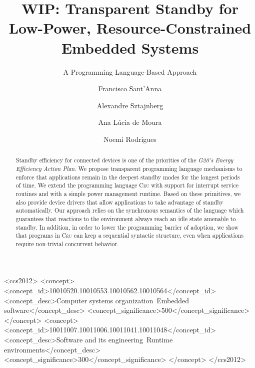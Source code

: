 \documentclass[sigplan,screen]{acmart}
\newcommand{\CEU}{\textsc{C\'{e}u}\xspace}
\begin{document}
\title{WIP: Transparent Standby for Low-Power, Resource-Constrained Embedded Systems}
\subtitle{A Programming Language-Based Approach}


\author[F.~Sant'Anna]{Francisco Sant'Anna}
%
\author[A.~Sztajnberg]{Alexandre Sztajnberg}
%
\author[A.L..~de~Moura]{Ana L\'ucia de Moura}
%
\author[N.~Rodrigues]{Noemi Rodrigues}


\begin{abstract}
Standby efficiency for connected devices is one of the priorities of the
\emph{G20's Energy Efficiency Action Plan}.
%
We propose transparent programming language mechanisms to enforce that
applications remain in the deepest standby modes for the longest periods of
time.
%
We extend the programming language \CEU with support for interrupt service
routines and with a simple power management runtime.
%
Based on these primitives, we also provide device drivers that allow
applications to take advantage of standby automatically.
%
Our approach relies on the synchronous semantics of the language which
guarantees that reactions to the environment always reach an idle state
amenable to standby.
%
In addition, in order to lower the programming barrier of adoption, we show
that programs in \CEU can keep a sequential syntactic structure, even when
applications require non-trivial concurrent behavior.
\end{abstract}

%
%
\begin{CCSXML}
<ccs2012>
    <concept>
        <concept_id>10010520.10010553.10010562.10010564</concept_id>
        <concept_desc>Computer systems organization~Embedded software</concept_desc>
    <concept_significance>500</concept_significance>
    </concept>
    <concept>
        <concept_id>10011007.10011006.10011041.10011048</concept_id>
        <concept_desc>Software and its engineering~Runtime environments</concept_desc>
        <concept_significance>300</concept_significance>
    </concept>
</ccs2012>
\end{CCSXML}
\end{document}
